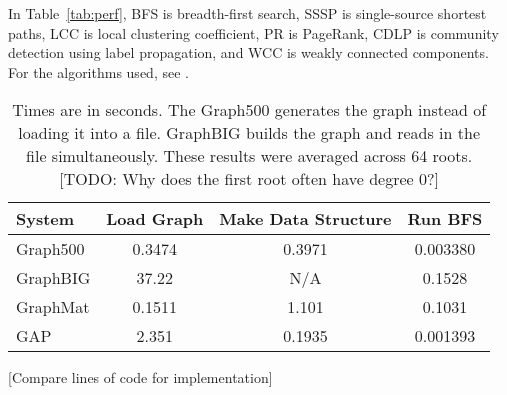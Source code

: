 \documentclass[conference]{IEEEtran}
\begin{document}
In Table~\ref{tab:perf}, BFS is breadth-first search, SSSP is single-source shortest paths, LCC is local clustering coefficient, PR is PageRank, CDLP is community detection using label propagation, and WCC is weakly connected components. For the algorithms used, see \cite{Iosup:2016:Graphalyticstech}.

\begin{table}[!htb]
	\centering

		\centering
	\caption{Performance Results for the \texttt{dota-league} dataset with 61,670 vertices and 50,870,313 edges.}
	\label{tab:perf}
\end{table}

\begin{table}[!htb]
	\centering
	\begin{tabular}{l|c|c|c}
		System & Load Graph & Make Data Structure & Run BFS \\ \hline
		Graph500 & 0.3474 & 0.3971 & 0.003380 \\
		GraphBIG & 37.22  & N/A    & 0.1528 \\
		GraphMat & 0.1511 & 1.101  & 0.1031 \\
		GAP      & 2.351  & 0.1935 & 0.001393 \\
	\end{tabular}
	\caption{Times are in seconds. The Graph500 generates the graph instead of loading it into a file. GraphBIG builds the graph and reads in the file simultaneously. These results were averaged across 64 roots. [TODO: Why does the first root often have degree 0?]}
	\label{tab:fileload}
\end{table}

[Compare lines of code for implementation]
\end{document}

